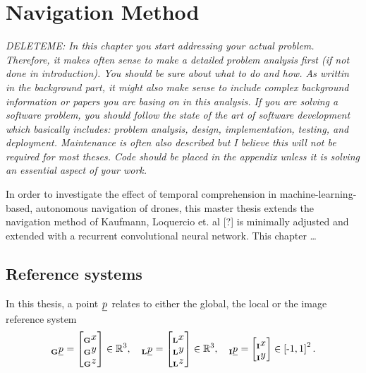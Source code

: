 \chapter{Navigation Method}
\label{mainone}
\textit{
DELETEME: In this chapter you start addressing your actual problem. Therefore, it makes often sense to make a detailed problem analysis first (if not done in introduction). You should be sure about what to do and how. As writtin in the background part, it might also make sense to include complex background information or papers you are basing on in this analysis. If you are solving a software problem, you should follow the state of the art of software development which basically includes: problem analysis, design, implementation, testing, and deployment. Maintenance is often also described but I believe this will not be required for most theses. Code should be placed in the appendix unless it is solving an essential aspect of your work.
}





In order to investigate the effect of temporal comprehension in machine-learning-based, autonomous navigation of drones,
this master thesis extends the navigation method of Kaufmann, Loquercio et. al [?] is minimally adjusted and extended with a recurrent convolutional neural network.
This chapter \dots



\section{Reference systems}
In this thesis, a point 
$\pos[]{}{}{}{}$
relates to either the global, the local or the image reference system
\begin{equation}
    \pos[]{}{}{\grs}{} = \begin{bmatrix}
        \x[]{}{}{\grs}{} \\ \y[]{}{}{\grs}{} \\ \z[]{}{}{\grs}{}
    \end{bmatrix} \in \mathbb{R}^3
    ,\quad 
    \pos[]{}{}{\lrs}{} = \begin{bmatrix}
        \x[]{}{}{\lrs}{} \\ \y[]{}{}{\lrs}{} \\ \z[]{}{}{\lrs}{}
    \end{bmatrix} \in \mathbb{R}^3
    ,\quad 
    \pos[]{}{}{\irs}{} = \begin{bmatrix}
        \x[]{}{}{\irs}{} \\ \y[]{}{}{\irs}{}
    \end{bmatrix} \in \left[\text -1, 1\right]^2.
\end{equation}


